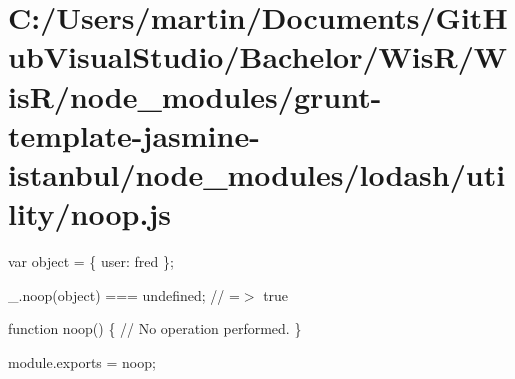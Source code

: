 \hypertarget{_c_1_2_users_2martin_2_documents_2_git_hub_visual_studio_2_bachelor_2_wis_r_2_wis_r_2node_module7b36e39da936e656ea1eb07f617b1dff}{}\section{C\+:/\+Users/martin/\+Documents/\+Git\+Hub\+Visual\+Studio/\+Bachelor/\+Wis\+R/\+Wis\+R/node\+\_\+modules/grunt-\/template-\/jasmine-\/istanbul/node\+\_\+modules/lodash/utility/noop.\+js}
var object = \{ \textquotesingle{}user\textquotesingle{}\+: \textquotesingle{}fred\textquotesingle{} \};

\+\_\+.\+noop(object) === undefined; // =$>$ true


\begin{DoxyCodeInclude}

\textcolor{keyword}{function} noop() \{
  \textcolor{comment}{// No operation performed.}
\}

module.exports = noop;
\end{DoxyCodeInclude}
 